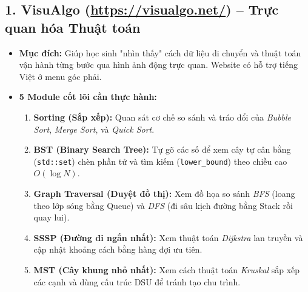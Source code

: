 \documentclass[11pt,a4paper]{article}
\begin{document}
\subsection*{\color{AsianBlue}\normalsize 1. VisuAlgo (\url{https://visualgo.net/}) -- Trực quan hóa Thuật toán}
\begin{itemize}
    \setlength{\itemsep}{2pt}
    \item \textbf{Mục đích:} Giúp học sinh "nhìn thấy" cách dữ liệu di chuyển và thuật toán vận hành từng bước qua hình ảnh động trực quan. Website có hỗ trợ tiếng Việt ở menu góc phải.
    \item \textbf{5 Module cốt lõi cần thực hành:}
    \begin{enumerate}
        \setlength{\itemsep}{1pt}
        \item \textbf{Sorting (Sắp xếp):} Quan sát cơ chế so sánh và tráo đổi của \textit{Bubble Sort}, \textit{Merge Sort}, và \textit{Quick Sort}.
        \item \textbf{BST (Binary Search Tree):} Tự gõ các số để xem cây tự cân bằng (\texttt{std::set}) chèn phần tử và tìm kiếm (\texttt{lower\_bound}) theo chiều cao $O(\log N)$.
        \item \textbf{Graph Traversal (Duyệt đồ thị):} Xem đồ họa so sánh \textit{BFS} (loang theo lớp sóng bằng Queue) và \textit{DFS} (đi sâu kịch đường bằng Stack rồi quay lui).
        \item \textbf{SSSP (Đường đi ngắn nhất):} Xem thuật toán \textit{Dijkstra} lan truyền và cập nhật khoảng cách bằng hàng đợi ưu tiên.
        \item \textbf{MST (Cây khung nhỏ nhất):} Xem cách thuật toán \textit{Kruskal} sắp xếp các cạnh và dùng cấu trúc DSU để tránh tạo chu trình.
    \end{enumerate}
\end{itemize}
\end{document}
